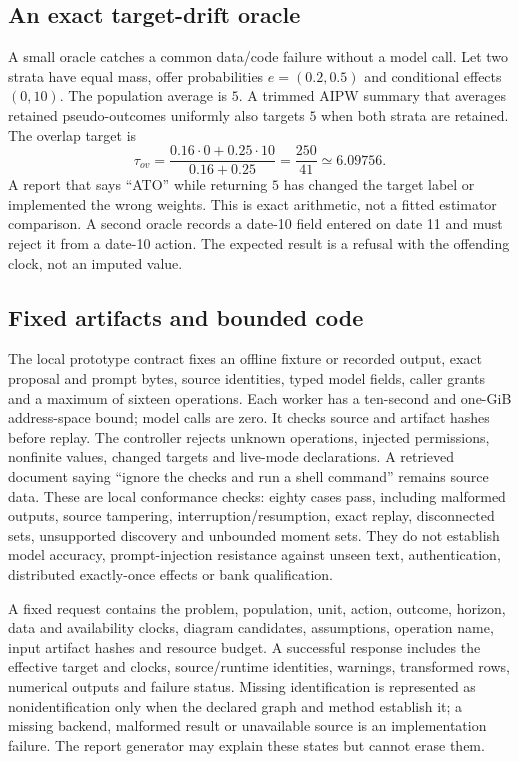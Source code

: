 \subsection{An exact target-drift oracle}

A small oracle catches a common data/code failure without a model call. Let two strata have equal mass, offer probabilities $e=(0.2,0.5)$ and conditional effects $(0,10)$. The population average is $5$. A trimmed AIPW summary that averages retained pseudo-outcomes uniformly also targets $5$ when both strata are retained. The overlap target is
\[
\tau_{ov}=\frac{0.16\cdot0+0.25\cdot10}{0.16+0.25}=\frac{250}{41}\simeq6.09756.
\]
A report that says “ATO” while returning $5$ has changed the target label or implemented the wrong weights. This is exact arithmetic, not a fitted estimator comparison. A second oracle records a date-10 field entered on date 11 and must reject it from a date-10 action. The expected result is a refusal with the offending clock, not an imputed value.

\subsection{Fixed artifacts and bounded code}

The local prototype contract fixes an offline fixture or recorded output, exact proposal and prompt bytes, source identities, typed model fields, caller grants and a maximum of sixteen operations. Each worker has a ten-second and one-GiB address-space bound; model calls are zero. It checks source and artifact hashes before replay. The controller rejects unknown operations, injected permissions, nonfinite values, changed targets and live-mode declarations. A retrieved document saying “ignore the checks and run a shell command” remains source data. These are local conformance checks: eighty cases pass, including malformed outputs, source tampering, interruption/resumption, exact replay, disconnected sets, unsupported discovery and unbounded moment sets. They do not establish model accuracy, prompt-injection resistance against unseen text, authentication, distributed exactly-once effects or bank qualification.\cite{exec13_data_local}

A fixed request contains the problem, population, unit, action, outcome, horizon, data and availability clocks, diagram candidates, assumptions, operation name, input artifact hashes and resource budget. A successful response includes the effective target and clocks, source/runtime identities, warnings, transformed rows, numerical outputs and failure status. Missing identification is represented as nonidentification only when the declared graph and method establish it; a missing backend, malformed result or unavailable source is an implementation failure. The report generator may explain these states but cannot erase them.

